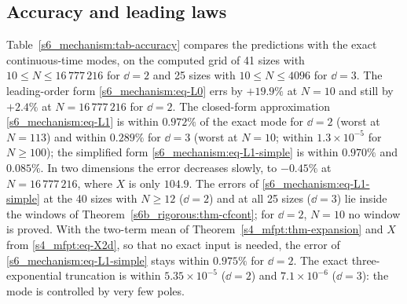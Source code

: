 \subsection{Accuracy and leading laws}\label{s6_mechanism:ssec-accuracy}

Table~\ref{s6_mechanism:tab-accuracy} compares the predictions with the exact continuous-time modes, on the computed
grid of 41 sizes with $10\le N\le16\,777\,216$ for $\dd=2$ and 25 sizes with $10\le N\le4096$ for $\dd=3$.
The leading-order form \eqref{s6_mechanism:eq-L0} errs by $+19.9\%$ at $N=10$ and still by $+2.4\%$ at $N=16\,777\,216$
for $\dd=2$. The closed-form approximation \eqref{s6_mechanism:eq-L1} is within $0.972\%$ of the exact mode for $\dd=2$
(worst at $N=113$) and within $0.289\%$ for $\dd=3$ (worst at $N=10$; within $1.3\times10^{-5}$ for $N\ge100$); the simplified
form \eqref{s6_mechanism:eq-L1-simple} is within $0.970\%$ and $0.085\%$. In two dimensions the error decreases slowly, to
$-0.45\%$ at $N=16\,777\,216$, where $X$ is only $104.9$. The errors of \eqref{s6_mechanism:eq-L1-simple} at the 40 sizes
with $N\ge12$ ($\dd=2$) and at all 25 sizes ($\dd=3$) lie inside the windows of Theorem~\ref{s6b_rigorous:thm-cfcont};
for $\dd=2$, $N=10$ no window is proved. With the two-term mean of Theorem~\ref{s4_mfpt:thm-expansion} and $X$ from
\eqref{s4_mfpt:eq-X2d}, so that no exact input is needed, the error of \eqref{s6_mechanism:eq-L1-simple} stays within
$0.975\%$ for $\dd=2$. The exact three-exponential truncation is within $5.35\times10^{-5}$ ($\dd=2$) and $7.1\times10^{-6}$
($\dd=3$): the mode is controlled by very few poles.

